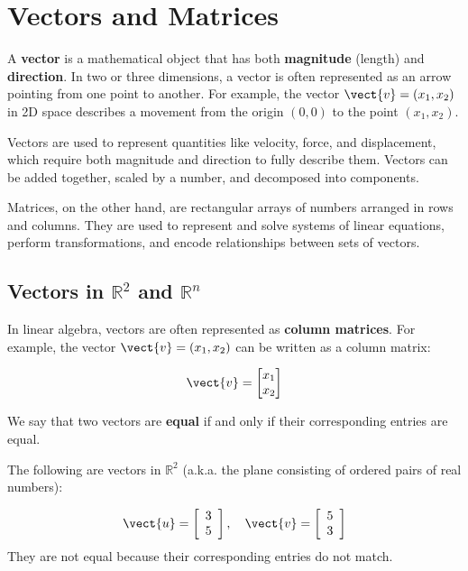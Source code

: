 \chapter{Vectors and Matrices}\label{chap:ch8}
A \textbf{vector} is a mathematical object that has both \textbf{magnitude} (length) and \textbf{direction}. In two or three dimensions, a vector is often represented as an arrow pointing from one point to another. For example, the vector \(\vect{v} = (x_1, x_2)\) in 2D space describes a movement from the origin \((0,0)\) to the point \((x_1, x_2)\).

Vectors are used to represent quantities like velocity, force, and displacement, which require both magnitude and direction to fully describe them. Vectors can be added together, scaled by a number, and decomposed into components.

Matrices, on the other hand, are rectangular arrays of numbers arranged in rows and columns. They are used to represent and solve systems of linear equations, perform transformations, and encode relationships between sets of vectors.

\section{Vectors in \texorpdfstring{$\mathbb{R}^2$}{R2} and \texorpdfstring{$\mathbb{R}^n$}{Rn}}

In linear algebra, vectors are often represented as \textbf{column matrices}. For example, the vector \(\vect{v} = (x_1, x_2)\) can be written as a column matrix:

\[ \vect{v} = \begin{bmatrix} x_1 \\ x_2 \end{bmatrix} \]

We say that two vectors are \textbf{equal} if and only if their corresponding entries are equal.

\begin{example}
    The following are vectors in $\mathbb{R}^2$ (a.k.a. the plane consisting of ordered pairs of real numbers):

    \[
    \vect{u}=\left[\begin{array}{l}
    3 \\
    5
    \end{array}\right], \quad \vect{v}=\left[\begin{array}{l}
    5 \\
    3
    \end{array}\right]
    \]
    They are not equal because their corresponding entries do not match.
\end{example}


